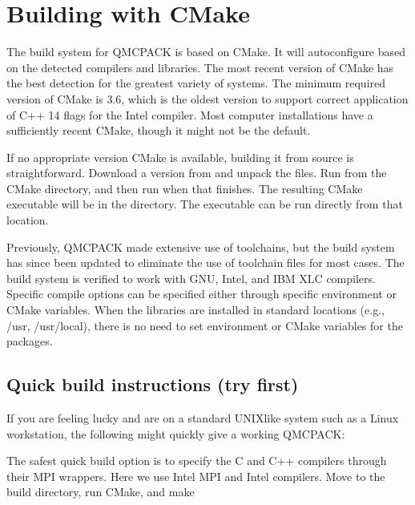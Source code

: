 \documentclass[letterpaper,10pt,english]{sphinxmanual}
\begin{document}
\section{Building with CMake}
\label{\detokenize{installation:building-with-cmake}}\label{\detokenize{installation:cmake}}
The build system for QMCPACK is based on CMake. It will autoconfigure
based on the detected compilers and libraries. The most recent version
of CMake has the best detection for the greatest variety of systems. The
minimum required version of CMake is 3.6, which is the oldest version to
support correct application of C++ 14 flags for the Intel compiler. Most
computer installations have a sufficiently recent CMake, though it might
not be the default.

If no appropriate version CMake is available, building it from source is
straightforward. Download a version from  and
unpack the files. Run  from the CMake directory, and then run  when that
finishes. The resulting CMake executable will be in the directory. The
executable can be run directly from that location.

Previously, QMCPACK made extensive use of toolchains, but the build
system has since been updated to eliminate the use of toolchain files
for most cases. The build system is verified to work with GNU, Intel,
and IBM XLC compilers. Specific compile options can be specified either
through specific environment or CMake variables. When the libraries are
installed in standard locations (e.g., /usr, /usr/local), there is no
need to set environment or CMake variables for the packages.


\subsection{Quick build instructions (try first)}
\label{\detokenize{installation:quick-build-instructions-try-first}}\label{\detokenize{installation:cmakequick}}
If you are feeling lucky and are on a standard UNIX\sphinxhyphen{}like system such as
a Linux workstation, the following might quickly give a working QMCPACK:

The safest quick build option is to specify the C and C++ compilers
through their MPI wrappers. Here we use Intel MPI and Intel compilers.
Move to the build directory, run CMake, and make

\begin{sphinxVerbatim}[commandchars=\\\{\}]
 
   
  
\end{sphinxVerbatim}
\end{document}
